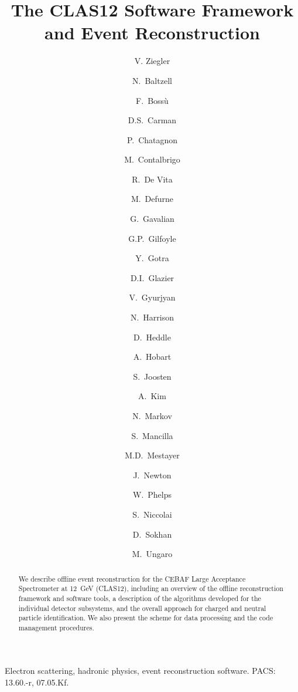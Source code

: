 \documentclass[3p,times,twocolumn]{elsarticle}
\begin{document}
\begin{frontmatter}

\title{The CLAS12 Software Framework and Event Reconstruction}

\author[JLab]{V. Ziegler}
\author[JLab]{N.~Baltzell}
\author[Saclay]{F.~Boss\`u}
\author[JLab]{D.S.~Carman}
\author[IPNO]{P.~Chatagnon}
\author[INFNFE]{M.~Contalbrigo}
\author[INFNGE]{R.~De Vita}
\author[Saclay]{M.~Defurne}
\author[JLab]{G.~Gavalian}
\author[RichU]{G.P.~Gilfoyle}
\author[JLab]{Y.~Gotra}
\author[Glasgow]{D.I.~Glazier}
\author[JLab]{V.~Gyurjyan}
\author[JLab]{N.~Harrison}
\author[CNU]{D.~Heddle}
\author[IPNO]{A.~Hobart}
\author[ANL]{S.~Joosten}
\author[UConn]{A.~Kim}
\author[JLab]{N.~Markov}
\author[Chile]{S.~Mancilla}
\author[JLab]{M.D.~Mestayer}
\author[ODU]{J.~Newton}
\author[CNU]{W.~Phelps}
\author[IPNO]{S.~Niccolai}
\author[Glasgow]{D.~Sokhan}
\author[JLab]{M.~Ungaro}

\address[JLab]{Thomas Jefferson National Accelerator Facility, Newport News, VA 23606, USA}
\address[Saclay]{CEA-Saclay, Univ. Paris-Sud, Universit\'e Paris-Saclay, Gif-sur-Yvette, France}
\address[IPNO]{Institut de Physique Nucl\'eaire, CNRS-IN2P3, Univ. Paris-Sud, Universit\'e Paris-Saclay,
91406 Orsay Cedex, France}
\address[INFNFE]{INFN, Sezione di Ferrara, 44100 Ferrara, Italy}
\address[INFNGE]{INFN, Sezione di Genova, 16146 Genova, Italy}
\address[RichU]{University of Richmond, Richmond, 23173 VA , USA}
\address[Glasgow]{University of Glasgow, Glasgow G12 8QQ, United Kingdom}
\address[CNU]{Christopher Newport University, Newport News, 23606 VA , USA}
\address[ANL]{Argonne National Laboratory, Chicago, 60439 IL, USA}
\address[UConn]{University of Connecticut, Storrs, CT 06269, USA}
\address[Chile]{Universidad T\'{e}cnica Federico Santa Mar\'{i}a, Valpara\'{i}so, 2390123, Chile}
\address[ODU]{Old Dominion University, Norfolk, 23529 VA, USA}



\begin{abstract}
  We describe offline event reconstruction for the CEBAF Large Acceptance Spectrometer at 12~GeV (CLAS12),
  including an overview of the offline reconstruction framework and software tools, a description of the algorithms
  developed for the individual detector subsystems, and the overall approach for charged and neutral particle
  identification. We also present the scheme for data processing and the code management procedures.
\end{abstract}

\begin{keyword}
Electron scattering, hadronic physics, event reconstruction software. PACS: 13.60.-r, 07.05.Kf.
\end{keyword}

\end{frontmatter}
\end{document}
